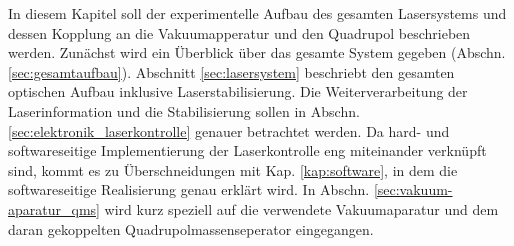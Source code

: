 In diesem Kapitel soll der experimentelle Aufbau des gesamten Lasersystems und
dessen Kopplung an die Vakuumapperatur und den Quadrupol beschrieben werden.
Zunächst wird ein Überblick über das gesamte System gegeben (Abschn.
\ref{sec:gesamtaufbau}). Abschnitt \ref{sec:lasersystem} beschriebt den gesamten
optischen Aufbau inklusive Laserstabilisierung. Die Weiterverarbeitung der
Laserinformation und die Stabilisierung sollen in Abschn.
\ref{sec:elektronik_laserkontrolle} genauer betrachtet werden. Da
hard- und softwareseitige Implementierung der Laserkontrolle eng miteinander verknüpft
sind, kommt es zu Überschneidungen mit Kap. \ref{kap:software}, in dem die
softwareseitige Realisierung genau erklärt wird. In Abschn.
\ref{sec:vakuum-aparatur_qms} wird kurz speziell auf die verwendete
Vakuumaparatur und dem daran gekoppelten Quadrupolmassenseperator eingegangen.

